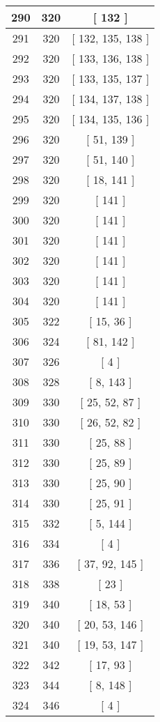 \begin{center}
\begin{longtable}[H]{|| c c c ||}
\hline
290 & 320 & [ 132 ] \\ 
\hline
291 & 320 & [ 132, 135, 138 ] \\ 
\hline
292 & 320 & [ 133, 136, 138 ] \\ 
\hline
293 & 320 & [ 133, 135, 137 ] \\ 
\hline
294 & 320 & [ 134, 137, 138 ] \\ 
\hline
295 & 320 & [ 134, 135, 136 ] \\ 
\hline
296 & 320 & [ 51, 139 ] \\ 
\hline
297 & 320 & [ 51, 140 ] \\ 
\hline
298 & 320 & [ 18, 141 ] \\ 
\hline
299 & 320 & [ 141 ] \\ 
\hline
300 & 320 & [ 141 ] \\ 
\hline
301 & 320 & [ 141 ] \\ 
\hline
302 & 320 & [ 141 ] \\ 
\hline
303 & 320 & [ 141 ] \\ 
\hline
304 & 320 & [ 141 ] \\ 
\hline
305 & 322 & [ 15, 36 ] \\ 
\hline
306 & 324 & [ 81, 142 ] \\ 
\hline
307 & 326 & [ 4 ] \\ 
\hline
308 & 328 & [ 8, 143 ] \\ 
\hline
309 & 330 & [ 25, 52, 87 ] \\ 
\hline
310 & 330 & [ 26, 52, 82 ] \\ 
\hline
311 & 330 & [ 25, 88 ] \\ 
\hline
312 & 330 & [ 25, 89 ] \\ 
\hline
313 & 330 & [ 25, 90 ] \\ 
\hline
314 & 330 & [ 25, 91 ] \\ 
\hline
315 & 332 & [ 5, 144 ] \\ 
\hline
316 & 334 & [ 4 ] \\ 
\hline
317 & 336 & [ 37, 92, 145 ] \\ 
\hline
318 & 338 & [ 23 ] \\ 
\hline
319 & 340 & [ 18, 53 ] \\ 
\hline
320 & 340 & [ 20, 53, 146 ] \\ 
\hline
321 & 340 & [ 19, 53, 147 ] \\ 
\hline
322 & 342 & [ 17, 93 ] \\ 
\hline
323 & 344 & [ 8, 148 ] \\ 
\hline
324 & 346 & [ 4 ] \\ 

\end{longtable}
\end{center}
